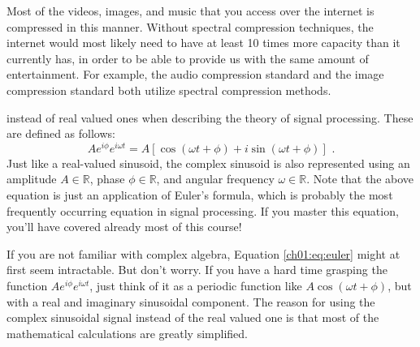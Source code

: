 Most of the videos, images, and music that you access over the
internet is compressed in this manner. Without spectral compression
techniques, the internet would most likely need to have at least 10
times more capacity than it currently has, in order to be able to
provide us with the same amount of entertainment. For example,
the  audio compression standard and
the  image compression standard both utilize spectral
compression methods.


 instead of real valued ones when describing the theory of signal
processing. These are defined as follows:
\begin{equation}
A e^{i\phi }e^{i\omega t} = A[\cos(\omega t+\phi) + i\sin(\omega
t+\phi)] \,\,.
\label{ch01:eq:euler}
\end{equation}
Just like a real-valued sinusoid, the complex sinusoid is also
represented using an amplitude $A \in \mathbb{R}$, phase
$\phi \in \mathbb{R}$, and angular frequency $\omega \in \mathbb{R}$. Note
that the above equation is just an application of Euler's
formula, which is probably the most frequently occurring
equation in signal processing. If you master this equation, you'll
have covered already most of this course!

If you are not familiar with complex algebra,
Equation \ref{ch01:eq:euler} might at first seem intractable. But
don't worry. If you have a hard time grasping the function $A e^{i\phi
}e^{i\omega t}$, just think of it as a periodic function like
$A\cos(\omega t + \phi)$, but with a real and imaginary sinusoidal
component. The reason for using the complex sinusoidal signal instead
of the real valued one is that most of the mathematical calculations
are greatly simplified.

